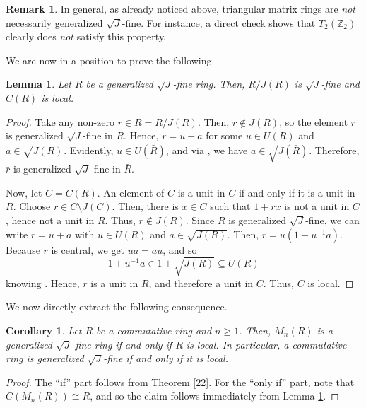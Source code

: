 \documentclass[12pt]{amsart}
\newtheorem{lemma}[theorem]{Lemma}
\newtheorem{corollary}[theorem]{Corollary}
\theoremstyle{definition}
\newtheorem{remark}[theorem]{Remark}
\begin{document}
\begin{remark}
In general, as already noticed above, triangular matrix rings are \textit{not} necessarily generalized \(\sqrt{J}\)-fine. For instance, a direct check shows that \(T_2(\mathbb{Z}_2)\) clearly does \textit{not} satisfy this property.
\end{remark}

We are now in a position to prove the following.

\begin{lemma}\label{2.8}
Let \( R \) be a generalized $\sqrt{J}$-fine ring. Then, \( R/J(R) \) is $\sqrt{J}$-fine and \( C(R) \) is local.
\end{lemma}

\begin{proof}
Take any non-zero \( \bar{r} \in \bar{R} = R/J(R) \). Then, \( r \not\in J(R) \), so the element \( r \) is generalized \( \sqrt{J} \)-fine in \( R \). Hence, \( r = u + a \) for some \( u \in U(R) \) and \( a \in \sqrt{J(R)} \). Evidently, \( \bar{u} \in U(\bar{R}) \), and via \cite[Lemma 2.1(5)]{DDE}, we have \( \bar{a} \in \sqrt{J(\bar{R})} \). Therefore, \( \bar{r} \) is generalized \( \sqrt{J} \)-fine in \( \bar{R} \).
	
Now, let \( C = C(R) \). An element of \( C \) is a unit in \( C \) if and only if it is a unit in \( R \). Choose \( r \in C \setminus J(C) \). Then, there is \( x \in C \) such that \( 1 + rx \) is not a unit in \( C \), hence not a unit in \( R \). Thus, \( r \not\in J(R) \). Since \( R \) is generalized \( \sqrt{J} \)-fine, we can write \( r = u + a \) with \( u \in U(R) \) and \( a \in \sqrt{J(R)} \). Then, \( r = u(1 + u^{-1}a) \). Because \( r \) is central, we get \( ua = au \), and so \[ 1 + u^{-1}a \in 1 + \sqrt{J(R)} \subseteq U(R) \] knowing \cite[Lemma 2.1(1)]{DDE}. Hence, \( r \) is a unit in \( R \), and therefore a unit in \( C \). Thus, \( C \) is local.
\end{proof}

We now directly extract the following consequence.

\begin{corollary}\label{2.9}
Let \( R \) be a commutative ring and \( n \ge 1 \). Then, \( M_n(R) \) is a generalized $\sqrt{J}$-fine ring if and only if \( R \) is local. In particular, a commutative ring is generalized $\sqrt{J}$-fine if and only if it is local.
\end{corollary}

\begin{proof}
The ``if'' part follows from Theorem \ref{22}. For the ``only if'' part, note that \( C(M_n(R)) \cong R \), and so the claim follows immediately from Lemma \ref{2.8}.
\end{proof}
\end{document}
